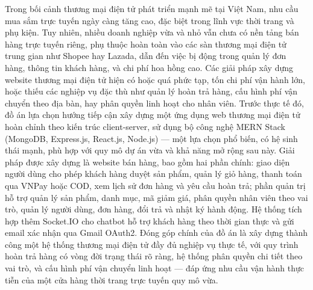 Trong bối cảnh thương mại điện tử phát triển mạnh mẽ tại Việt Nam, nhu cầu mua
sắm trực tuyến ngày càng tăng cao, đặc biệt trong lĩnh vực thời trang và phụ kiện.
Tuy nhiên, nhiều doanh nghiệp vừa và nhỏ vẫn chưa có nền tảng bán hàng trực
tuyến riêng, phụ thuộc hoàn toàn vào các sàn thương mại điện tử trung gian như
Shopee hay Lazada, dẫn đến việc bị động trong quản lý đơn hàng, thông tin khách
hàng, và chi phí hoa hồng cao. Các giải pháp xây dựng website thương mại điện
tử hiện có hoặc quá phức tạp, tốn chi phí vận hành lớn, hoặc thiếu các nghiệp vụ
đặc thù như quản lý hoàn trả hàng, cấu hình phí vận chuyển theo địa bàn, hay phân
quyền linh hoạt cho nhân viên.
Trước thực tế đó, đồ án lựa chọn hướng tiếp cận xây dựng một ứng dụng web
thương mại điện tử hoàn chỉnh theo kiến trúc client-server, sử dụng bộ công nghệ
MERN Stack (MongoDB, Express.js, React.js, Node.js) — một lựa chọn phổ biến,
có hệ sinh thái mạnh, phù hợp với quy mô dự án vừa và khả năng mở rộng sau này.
Giải pháp được xây dựng là website bán hàng, bao gồm hai phần chính: giao
diện người dùng cho phép khách hàng duyệt sản phẩm, quản lý giỏ hàng, thanh
toán qua VNPay hoặc COD, xem lịch sử đơn hàng và yêu cầu hoàn trả; phần quản
trị hỗ trợ quản lý sản phẩm, danh mục, mã giảm giá, phân quyền nhân viên theo
vai trò, quản lý người dùng, đơn hàng, đổi trả và nhật ký hành động. Hệ thống tích
hợp thêm Socket.IO cho chatbot hỗ trợ khách hàng theo thời gian thực và gửi email
xác nhận qua Gmail OAuth2.
Đóng góp chính của đồ án là xây dựng thành công một hệ thống thương mại
điện tử đầy đủ nghiệp vụ thực tế, với quy trình hoàn trả hàng có vòng đời trạng thái
rõ ràng, hệ thống phân quyền chi tiết theo vai trò, và cấu hình phí vận chuyển linh
hoạt — đáp ứng nhu cầu vận hành thực tiễn của một cửa hàng thời trang trực tuyến
quy mô vừa.